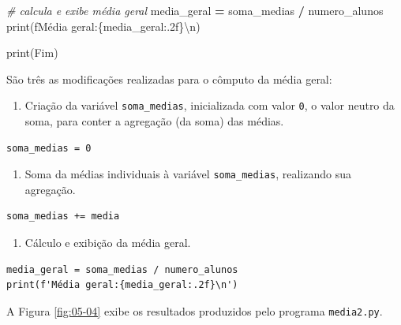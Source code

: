 \documentclass[
]{book}
\newenvironment{Shaded}{\begin{snugshade}}{\end{snugshade}}
\newcommand{\BuiltInTok}[1]{#1}
\newcommand{\CharTok}[1]{\textcolor[rgb]{0.31,0.60,0.02}{#1}}
\newcommand{\CommentTok}[1]{\textcolor[rgb]{0.56,0.35,0.01}{\textit{#1}}}
\newcommand{\NormalTok}[1]{#1}
\newcommand{\OperatorTok}[1]{\textcolor[rgb]{0.81,0.36,0.00}{\textbf{#1}}}
\newcommand{\SpecialCharTok}[1]{\textcolor[rgb]{0.00,0.00,0.00}{#1}}
\newcommand{\SpecialStringTok}[1]{\textcolor[rgb]{0.31,0.60,0.02}{#1}}
\newcommand{\StringTok}[1]{\textcolor[rgb]{0.31,0.60,0.02}{#1}}
\providecommand{\tightlist}{%
  \setlength{\itemsep}{0pt}\setlength{\parskip}{0pt}}
\begin{document}
\begin{Shaded}
\begin{Highlighting}[]
\CommentTok{\# calcula e exibe média geral}
\NormalTok{media\_geral }\OperatorTok{=}\NormalTok{ soma\_medias }\OperatorTok{/}\NormalTok{ numero\_alunos}
\BuiltInTok{print}\NormalTok{(}\SpecialStringTok{f\textquotesingle{}Média geral:}\SpecialCharTok{\{}\NormalTok{media\_geral}\SpecialCharTok{:.2f\}}\CharTok{\textbackslash{}n}\SpecialStringTok{\textquotesingle{}}\NormalTok{)}

\BuiltInTok{print}\NormalTok{(}\StringTok{\textquotesingle{}Fim\textquotesingle{}}\NormalTok{)}
\end{Highlighting}
\end{Shaded}

São três as modificações realizadas para o cômputo da média geral:

\begin{enumerate}
\def\labelenumi{\arabic{enumi}.}
\tightlist
\item
  Criação da variável \texttt{soma\_medias}, inicializada com valor \texttt{0}, o valor neutro da soma, para conter a agregação (da soma) das médias.
\end{enumerate}

\begin{verbatim}
soma_medias = 0
\end{verbatim}

\begin{enumerate}
\def\labelenumi{\arabic{enumi}.}
\setcounter{enumi}{1}
\tightlist
\item
  Soma da médias individuais à variável \texttt{soma\_medias}, realizando sua agregação.
\end{enumerate}

\begin{verbatim}
soma_medias += media
\end{verbatim}

\begin{enumerate}
\def\labelenumi{\arabic{enumi}.}
\setcounter{enumi}{2}
\tightlist
\item
  Cálculo e exibição da média geral.
\end{enumerate}

\begin{verbatim}
media_geral = soma_medias / numero_alunos
print(f'Média geral:{media_geral:.2f}\n')
\end{verbatim}

A Figura \ref{fig:05-04} exibe os resultados produzidos pelo programa \texttt{media2.py}.
\end{document}
